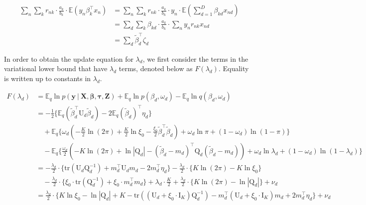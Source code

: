 \documentclass[twoside,11pt]{article}
\newcommand\given[1][]{\:#1\vert\:}
\newcommand{\transpose}[1]{#1^{\intercal}}
\newcommand{\nsum}{\sum\limits_{n}}
\newcommand{\ksum}{\sum\limits_{k}}
\newcommand{\boldbeta}{\boldsymbol\beta}
\newcommand{\boldtau}{\boldsymbol\tau}
\newcommand{\E}{\mathbb{E}}
\newcommand{\betad}{\tilde{\beta}_d}
\newcommand{\umat}{\mathrm{U}}
\newcommand{\qmat}{\mathrm{Q}}
\newcommand{\pr}[1]{p \left( #1 \right)}
\newcommand{\trace}[1]{\mathrm{tr} \left( #1 \right)}
\begin{document}
\begin{align*}
	\nsum \ksum r_{nk} \cdot \frac{a_k}{b_k} \cdot \E \left( y_n \transpose{\beta_k}x_n \right) &= 
	\nsum \ksum r_{nk} \cdot \frac{a_k}{b_k} \cdot y_n \cdot \E \left( \sum_{d=1}^D \beta_{kd} x_{nd}\right)\\
	&= \sum_d \sum_k \beta_{kd} \cdot \frac{a_k}{b_k} \cdot \sum_n y_n r_{nk} x_{nd} \\
	&= \sum_d \transpose{\betad} \zeta_d
\end{align*}


In order to obtain the update equation for $\lambda_d$, we first consider the terms in the variational lower bound that have $\lambda_d$ terms, denoted below as $F(\lambda_d)$. Equality is written up to constants in $\lambda_d$.

\begin{align*}
	F(\lambda_d) &= \E_q \ln \pr{\mathbf{y} \given \mathbf{X}, \boldbeta, \boldtau, \mathbf{Z}} + \E_q \ln \pr{\beta_d, \omega_d} - \E_q \ln q \left( \beta_d, \omega_d \right) \\
	&= - \frac{1}{2}\Big\{ \E_q \left( \transpose{\betad} \umat_d \betad\right) - 2 \transpose{\E_q \left( \betad \right)} \eta_d \Big\} \\
	& \quad + \E_q \Big\{ \omega_d \left( -\frac{K}{2} \ln (2\pi) + \frac{K}{2} \ln \xi_0 - \frac{\xi_0}{2} \transpose{\betad} \betad  \right) + \omega_d \ln \pi + (1 - \omega_d) \ln (1 - \pi) \Big\} \\
	& \quad - \E_q \Big\{ \frac{\omega_d}{2} \left( -K \ln (2 \pi) + \ln |\qmat_d | - \transpose{\left( \betad - m_d \right)} \qmat_d \left( \betad - m_d \right)\right) + \omega_d \ln \lambda_d + (1-\omega_d) \ln (1 - \lambda_d) \Big\} \\
	&= -\frac{\lambda_d }{2}  \cdot \Big\{ \trace{\umat_d \qmat_d^{-1}} + \transpose{m_d} \umat_d m_d - 2 \transpose{m_d} \eta_d \Big\}-\frac{\lambda_d }{2}  \cdot \Big\{ K \ln(2\pi) - K \ln \xi_0 \Big\} \\
	& \quad -\frac{\lambda_d }{2}  \cdot \Big\{ \xi_0 \cdot \trace{\qmat_d^{-1}} + \xi_0 \cdot \transpose{m_d} m_d \Big\} + \lambda_d \cdot \frac{K}{2} + \frac{\lambda_d}{2}  \cdot \Big\{ K \ln (2\pi) - \ln |\qmat_d | \Big\} + \nu_d \\
	&= \frac{\lambda_d}{2} \cdot \Bigg\{ K \ln \xi_0 - \ln |\qmat_d | + K -  \trace{\left(\umat_d + \xi_0 \cdot \mathrm{I}_K \right) \qmat_d^{-1}} - \transpose{m_d} \left( \umat_d + \xi_0 \cdot \mathrm{I}_K \right) m_d + 2\transpose{m_d}\eta_d \Bigg\} + \nu_d\\

\end{align*}
\end{document}
